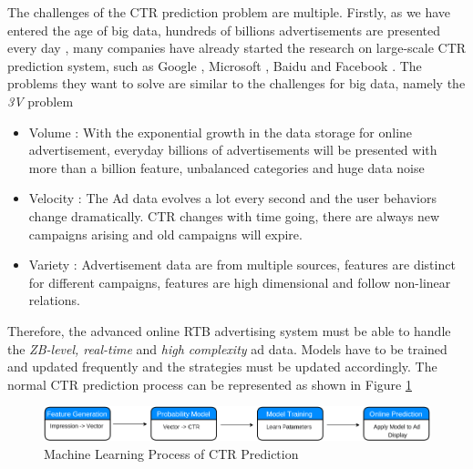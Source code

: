 The challenges of the CTR prediction problem are multiple. Firstly, as we have entered the age of big data, hundreds of billions advertisements are presented every day \cite{lohr2012age}, many companies have already started the research on large-scale CTR prediction system, such as Google \cite{mcmahan2013ad}, Microsoft \cite{graepel2010web}, Baidu \cite{liu2012enlister} and Facebook \cite{he2014practical}. The problems they want to solve are similar to the challenges for big data, namely the \textit{3V} problem
\begin{itemize}
  \item Volume : With the exponential growth in the data storage for online advertisement, everyday billions of advertisements will be presented with more than a billion feature, unbalanced categories and huge data noise
  \item Velocity : The Ad data evolves a lot every second and the user behaviors change dramatically. CTR changes with time going, there are always new campaigns arising and old campaigns will expire.
  \item Variety : Advertisement data are from multiple sources, features are distinct for different campaigns, features are high dimensional and follow non-linear relations.
\end{itemize}
Therefore, the advanced online RTB advertising system must be able to handle the \textit{ZB-level, real-time} and \textit{high complexity} ad data. Models have to be trained and updated frequently and the strategies must be updated accordingly. 
The normal CTR prediction process can be represented as shown in Figure \ref{fig:system}

\begin{figure}[h]
\centering
\includegraphics[width=\columnwidth]{system.png}
\caption{Machine Learning Process of CTR Prediction}
\label{fig:system}
\end{figure}


